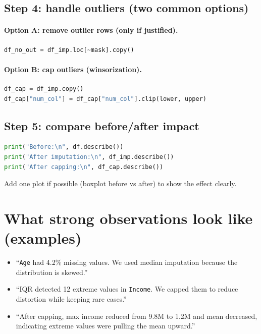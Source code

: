 \documentclass[11pt]{article}
\begin{document}
\subsection{Step 4: handle outliers (two common options)}
\paragraph{Option A: remove outlier rows (only if justified).}
\begin{lstlisting}[language=Python]
df_no_out = df_imp.loc[~mask].copy()
\end{lstlisting}

\paragraph{Option B: cap outliers (winsorization).}
\begin{lstlisting}[language=Python]
df_cap = df_imp.copy()
df_cap["num_col"] = df_cap["num_col"].clip(lower, upper)
\end{lstlisting}

\subsection{Step 5: compare before/after impact}
\begin{lstlisting}[language=Python]
print("Before:\n", df.describe())
print("After imputation:\n", df_imp.describe())
print("After capping:\n", df_cap.describe())
\end{lstlisting}
Add one plot if possible (boxplot before vs after) to show the effect clearly.

\section{What strong observations look like (examples)}
\begin{itemize}[leftmargin=*]
  \item ``\texttt{Age} had 4.2\% missing values. We used median imputation because the distribution is skewed.''
  \item ``IQR detected 12 extreme values in \texttt{Income}. We capped them to reduce distortion while keeping rare cases.''
  \item ``After capping, max income reduced from 9.8M to 1.2M and mean decreased, indicating extreme values were pulling the mean upward.''
\end{itemize}
\end{document}

